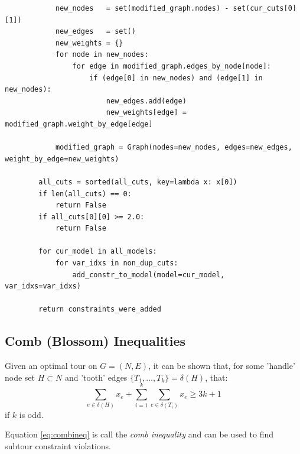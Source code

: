 \documentclass{article}
\begin{document}
\begin{flushleft}
\begin{flushleft}
\begin{flushleft}
\begin{lstlisting}
            new_nodes   = set(modified_graph.nodes) - set(cur_cuts[0][1])
            new_edges   = set()
            new_weights = {}
            for node in new_nodes:
                for edge in modified_graph.edges_by_node[node]:
                    if (edge[0] in new_nodes) and (edge[1] in new_nodes):
                        new_edges.add(edge)
                        new_weights[edge] = modified_graph.weight_by_edge[edge]

            modified_graph = Graph(nodes=new_nodes, edges=new_edges, weight_by_edge=new_weights)

        all_cuts = sorted(all_cuts, key=lambda x: x[0])
        if len(all_cuts) == 0:
            return False
        if all_cuts[0][0] >= 2.0:
            return False

        for cur_model in all_models:
            for var_idxs in non_dup_cuts:
                add_constr_to_model(model=cur_model, var_idxs=var_idxs)

        return constraints_were_added
\end{lstlisting}

\end{flushleft}

\end{flushleft}

\subsection{Comb (Blossom) Inequalities}
\begin{flushleft}

Given an optimal tour on $G = (N,E)$,
it can be shown that,
for some 'handle' node set $H \subset N$
and 'tooth' edges $\{ T_1,\ldots,T_k \} = \delta(H)$,
that:
\begin{equation} \label{eq:combineq}
  \sum_{e \in \delta(H)}{x_e} + \sum_{i = 1}^{k}{ \sum_{e \in \delta(T_i)}{x_e} } \geq 3k + 1
\end{equation}
if $k$ is odd.

Equation \eqref{eq:combineq} is call the \textit{comb inequality}
and can be used to find subtour constraint violations.


\end{flushleft}
\end{flushleft}
\end{document}
